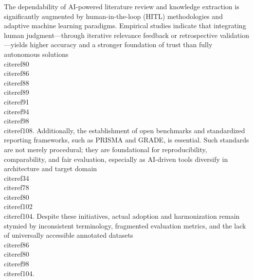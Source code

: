 \documentclass[11pt]{article}
\begin{document}
The dependability of AI-powered literature review and knowledge extraction is significantly augmented by human-in-the-loop (HITL) methodologies and adaptive machine learning paradigms. Empirical studies indicate that integrating human judgment—through iterative relevance feedback or retrospective validation—yields higher accuracy and a stronger foundation of trust than fully autonomous solutions \\cite{ref80}\\cite{ref86}\\cite{ref88}\\cite{ref89}\\cite{ref91}\\cite{ref94}\\cite{ref98}\\cite{ref108}. Additionally, the establishment of open benchmarks and standardized reporting frameworks, such as PRISMA and GRADE, is essential. Such standards are not merely procedural; they are foundational for reproducibility, comparability, and fair evaluation, especially as AI-driven tools diversify in architecture and target domain \\cite{ref34}\\cite{ref78}\\cite{ref80}\\cite{ref102}\\cite{ref104}. Despite these initiatives, actual adoption and harmonization remain stymied by inconsistent terminology, fragmented evaluation metrics, and the lack of universally accessible annotated datasets \\cite{ref86}\\cite{ref80}\\cite{ref98}\\cite{ref104}.
\end{document}
